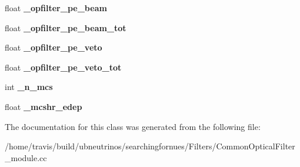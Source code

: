 \begin{DoxyCompactItemize}
\item 
\hypertarget{classCommonOpticalFilter_ada83cac25db1c34a32a052f306a5d994}{float {\bfseries \-\_\-opfilter\-\_\-pe\-\_\-beam}}\label{classCommonOpticalFilter_ada83cac25db1c34a32a052f306a5d994}

\item 
\hypertarget{classCommonOpticalFilter_a89ac8cb77d6821567d434b662be81257}{float {\bfseries \-\_\-opfilter\-\_\-pe\-\_\-beam\-\_\-tot}}\label{classCommonOpticalFilter_a89ac8cb77d6821567d434b662be81257}

\item 
\hypertarget{classCommonOpticalFilter_ac4bcde210f0c9b8e672e60d6fbd99915}{float {\bfseries \-\_\-opfilter\-\_\-pe\-\_\-veto}}\label{classCommonOpticalFilter_ac4bcde210f0c9b8e672e60d6fbd99915}

\item 
\hypertarget{classCommonOpticalFilter_a18702fe52e59501c913cc7a1c5c64374}{float {\bfseries \-\_\-opfilter\-\_\-pe\-\_\-veto\-\_\-tot}}\label{classCommonOpticalFilter_a18702fe52e59501c913cc7a1c5c64374}

\item 
\hypertarget{classCommonOpticalFilter_a66994974ea5877849ba5ab3e8cd826de}{int {\bfseries \-\_\-n\-\_\-mcs}}\label{classCommonOpticalFilter_a66994974ea5877849ba5ab3e8cd826de}

\item 
\hypertarget{classCommonOpticalFilter_ab677aab9e2b4d5dafd40801c1f93a947}{float {\bfseries \-\_\-mcshr\-\_\-edep}}\label{classCommonOpticalFilter_ab677aab9e2b4d5dafd40801c1f93a947}

\end{DoxyCompactItemize}


The documentation for this class was generated from the following file\-:\begin{DoxyCompactItemize}
\item 
/home/travis/build/ubneutrinos/searchingfornues/\-Filters/Common\-Optical\-Filter\-\_\-module.\-cc\end{DoxyCompactItemize}
